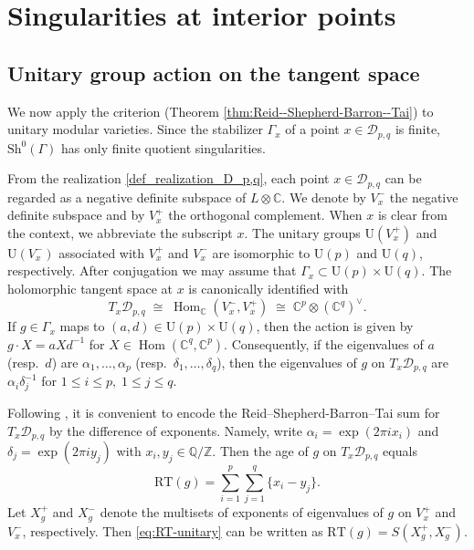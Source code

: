 \documentclass[11pt]{amsart}
\theoremstyle{plain}
\theoremstyle{definition}
\numberwithin{equation}{section}
\def\Hom{\mathop{\mathrm{Hom}}\nolimits}
\def\Hom{\mathop{\mathrm{Hom}}\nolimits}
\def\exp{\mathop{\mathrm{exp}}\nolimits}
\def\U{\mathrm{U}}
\newcommand{\bbC}{\mathbb{C}}
\newcommand{\bbQ}{\mathbb{Q}}
\newcommand{\bbZ}{\mathbb{Z}}
\begin{document}
\section{Singularities at interior points}

\subsection{Unitary group action on the tangent space}\label{subsec:unitary-action}

We now apply the criterion (Theorem \ref{thm:Reid--Shepherd-Barron--Tai}) to unitary modular varieties.
Since the stabilizer $\Gamma_x$ of a point
$x\in \mathcal{D}_{p,q}$ is finite, $\mathrm{Sh}^0(\Gamma)$ has only finite quotient singularities.

From the realization \eqref{def_realization_D_p,q}, each point $x \in \mathcal{D}_{p,q}$ can be regarded as a negative definite subspace of $L \otimes \bbC$.
We denote by $V_{x}^-$ the negative definite subspace and by $V_{x}^+$ the orthogonal complement.
When $x$ is clear from the context, we abbreviate the subscript $x$.
The unitary groups $\U(V_{x}^+)$ and $\U(V_{x}^-)$ associated with $V_{x}^+$ and $V_{x}^-$ are isomorphic to $\U(p)$ and $\U(q)$, respectively.
After
conjugation we may assume that $\Gamma_x\subset \U(p)\times \U(q)$.
The holomorphic
tangent space at $x$ is canonically identified with
\[
  T_x\mathcal{D}_{p,q}\;\cong\; \Hom_\bbC(V_{x}^-,V_{x}^+)\;\cong\; \bbC^p\otimes (\bbC^q)^\vee.
\]
If $g\in \Gamma_x$ maps to $(a,d)\in \U(p)\times \U(q)$, then the action is given by
  $g\cdot X = aXd^{-1}$ for $X\in \Hom(\bbC^q,\bbC^p)$.
Consequently, if the eigenvalues of $a$ (resp.\ $d$) are $\alpha_1,\dots,\alpha_p$
(resp.\ $\delta_1,\dots,\delta_q$), then the eigenvalues of $g$ on $T_x\mathcal{D}_{p,q}$ are $\alpha_i\delta_j^{-1}$ for $1\le i\le p,\; 1\le j\le q$.

Following \cite{reid1987young}, it is convenient to encode
the Reid--Shepherd-Barron--Tai sum for $T_x\mathcal{D}_{p,q}$ by the difference of exponents. Namely, write
$\alpha_i=\exp(2\pi i x_i)$ and $\delta_j=\exp(2\pi i y_j)$ with $x_i,y_j\in \bbQ/\bbZ$.
Then the age of $g$ on $T_x\mathcal{D}_{p,q}$ equals
\begin{equation}\label{eq:RT-unitary}
  \mathrm{RT}(g)=\sum_{i=1}^p\sum_{j=1}^q \{x_i-y_j\}.
\end{equation}
Let $X_g^+$ and $X_g^-$ denote the multisets of exponents of eigenvalues of $g$ on $V_x^+$ and $V_x^-$, respectively. Then \eqref{eq:RT-unitary} can be written as
$\mathrm{RT}(g)=S(X_g^+,X_g^-)$.
\end{document}
